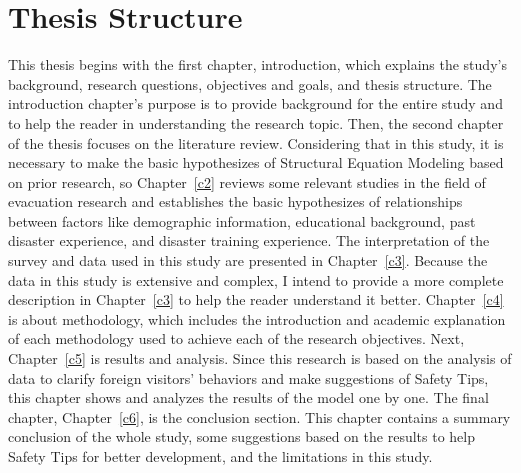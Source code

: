 \section{Thesis Structure}
This thesis begins with the first chapter, introduction, which explains the study's background, research questions, objectives and goals, and thesis structure. The introduction chapter's purpose is to provide background for the entire study and to help the reader in understanding the research topic. Then, the second chapter of the thesis focuses on the literature review. Considering that in this study, it is necessary to make the basic hypothesizes of Structural Equation Modeling based on prior research, so Chapter~\ref{c2} reviews some relevant studies in the field of evacuation research and establishes the basic hypothesizes of relationships between factors like demographic information, educational background, past disaster experience, and disaster training experience. The interpretation of the survey and data used in this study are presented in Chapter~\ref{c3}. Because the data in this study is extensive and complex, I intend to provide a more complete description in Chapter~\ref{c3} to help the reader understand it better. Chapter~\ref{c4} is about methodology, which includes the introduction and academic explanation of each methodology used to achieve each of the research objectives. Next, Chapter~\ref{c5} is results and analysis. Since this research is based on the analysis of data to clarify foreign visitors' behaviors and make suggestions of Safety Tips, this chapter shows and analyzes the results of the model one by one. The final chapter, Chapter~\ref{c6}, is the conclusion section. This chapter contains a summary conclusion of the whole study, some suggestions based on the results to help Safety Tips for better development, and the limitations in this study.

